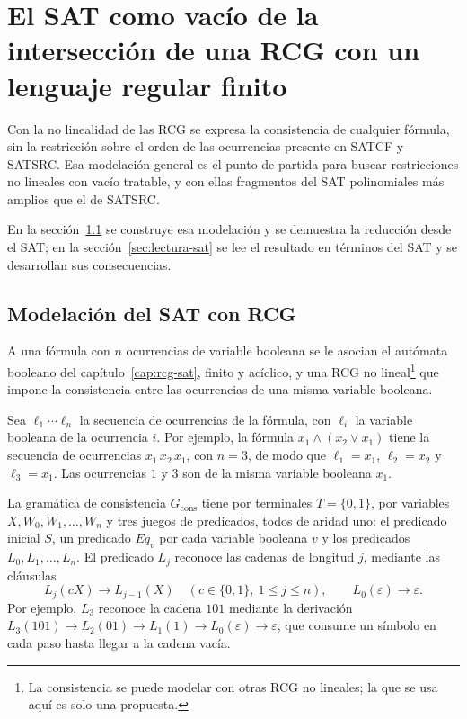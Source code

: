 
\chapter{El SAT como vacío de la intersección de una RCG con un lenguaje regular finito}
\label{cap:modelacion-sat}

Con la no linealidad de
las RCG se expresa la consistencia de cualquier fórmula, sin la
restricción sobre el orden de las ocurrencias presente en SATCF y
SATSRC. Esa modelación general es el punto de partida para buscar
restricciones no lineales con vacío tratable, y con ellas fragmentos
del SAT polinomiales más amplios que el de SATSRC.

En la sección~\ref{sec:modelacion-sat} se construye esa modelación y se
demuestra la reducción desde el SAT; en la sección~\ref{sec:lectura-sat} se lee
el resultado en términos del SAT y se desarrollan sus consecuencias.

\section{Modelación del SAT con RCG}
\label{sec:modelacion-sat}

A
una fórmula con $n$ ocurrencias de variable booleana se le asocian el autómata
booleano del capítulo~\ref{cap:rcg-sat}, finito y acíclico, y una RCG no
lineal\footnote{La consistencia se puede modelar con otras RCG no lineales; la que se
usa aquí es solo una propuesta.} que impone la consistencia entre las
ocurrencias de una misma variable booleana.

Sea $\ell_1\cdots\ell_n$ la secuencia de ocurrencias de la fórmula, con
$\ell_i$ la variable booleana de la ocurrencia $i$. Por ejemplo, la fórmula
$x_1 \wedge (x_2 \vee x_1)$ tiene la secuencia de ocurrencias
$x_1\,x_2\,x_1$, con $n = 3$, de modo que $\ell_1 = x_1$, $\ell_2 = x_2$
y $\ell_3 = x_1$. Las ocurrencias $1$ y $3$ son de la misma variable booleana
$x_1$.

La gramática de consistencia
$G_{\mathrm{cons}}$ tiene por terminales $T=\{0,1\}$, por variables
$X, W_0, W_1, \ldots, W_n$ y tres juegos de predicados, todos de
aridad uno: el predicado inicial $S$, un predicado $Eq_v$ por cada
variable booleana $v$ y los predicados $L_0, L_1, \ldots, L_n$. El
predicado $L_j$ reconoce las cadenas de longitud $j$, mediante las
cláusulas
\[
  L_j(cX) \to L_{j-1}(X) \quad (c \in \{0,1\},\ 1 \le j \le n),
  \qquad L_0(\varepsilon) \to \varepsilon.
\]
Por ejemplo, $L_3$ reconoce la cadena $101$ mediante la derivación
$L_3(101) \to L_2(01) \to L_1(1) \to L_0(\varepsilon) \to \varepsilon$,
que consume un símbolo en cada paso hasta llegar a la cadena vacía.

